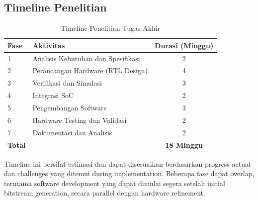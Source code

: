 \subsection{Timeline Penelitian}

\begin{table}[h]
\centering
\caption{Timeline Penelitian Tugas Akhir}
\begin{tabular}{|l|l|c|}
\hline
\textbf{Fase} & \textbf{Aktivitas} & \textbf{Durasi (Minggu)} \\
\hline
1 & Analisis Kebutuhan dan Spesifikasi & 2 \\
\hline
2 & Perancangan Hardware (RTL Design) & 4 \\
\hline
3 & Verifikasi dan Simulasi & 3 \\
\hline
4 & Integrasi SoC & 2 \\
\hline
5 & Pengembangan Software & 3 \\
\hline
6 & Hardware Testing dan Validasi & 2 \\
\hline
7 & Dokumentasi dan Analisis & 2 \\
\hline
\textbf{Total} & & \textbf{18 Minggu} \\
\hline
\end{tabular}
\end{table}

Timeline ini bersifat estimasi dan dapat disesuaikan berdasarkan progress actual dan challenges yang ditemui during implementation. Beberapa fase dapat overlap, terutama software development yang dapat dimulai segera setelah initial bitstream generation, secara parallel dengan hardware refinement.
